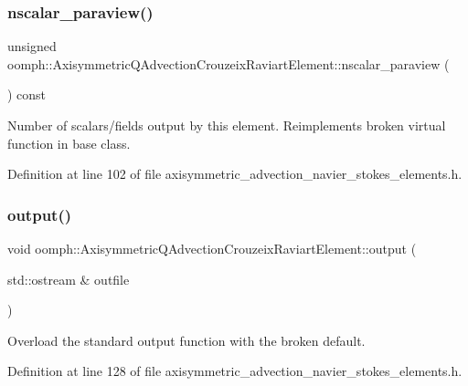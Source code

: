\subsubsection{\texorpdfstring{nscalar\+\_\+paraview()}{nscalar\_paraview()}}
{\footnotesize\ttfamily unsigned oomph\+::\+Axisymmetric\+Q\+Advection\+Crouzeix\+Raviart\+Element\+::nscalar\+\_\+paraview (\begin{DoxyParamCaption}{ }\end{DoxyParamCaption}) const\hspace{0.3cm}{\ttfamily [inline]}}



Number of scalars/fields output by this element. Reimplements broken virtual function in base class. 



Definition at line 102 of file axisymmetric\+\_\+advection\+\_\+navier\+\_\+stokes\+\_\+elements.\+h.

\mbox{\label{classoomph_1_1AxisymmetricQAdvectionCrouzeixRaviartElement_a157b747b92a9437b8bc599343bacc779}} 
\subsubsection{\texorpdfstring{output()}{output()}\hspace{0.1cm}{\footnotesize\ttfamily [1/4]}}
{\footnotesize\ttfamily void oomph\+::\+Axisymmetric\+Q\+Advection\+Crouzeix\+Raviart\+Element\+::output (\begin{DoxyParamCaption}\item[{std\+::ostream \&}]{outfile }\end{DoxyParamCaption})\hspace{0.3cm}{\ttfamily [inline]}}



Overload the standard output function with the broken default. 



Definition at line 128 of file axisymmetric\+\_\+advection\+\_\+navier\+\_\+stokes\+\_\+elements.\+h.

\mbox{\label{classoomph_1_1AxisymmetricQAdvectionCrouzeixRaviartElement_a4988d5a8f363cb7c7a6d019f1fe7b72b}} 
